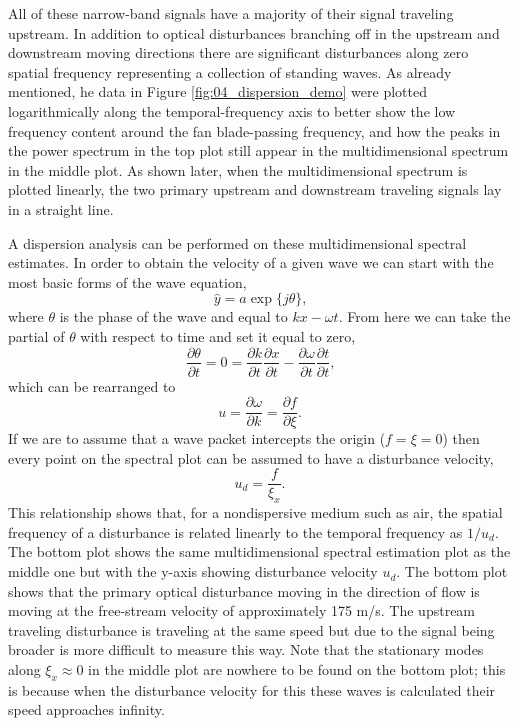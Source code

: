 All of these narrow-band signals have a majority of their signal traveling upstream.
In addition to optical disturbances branching off in the upstream and downstream moving directions there are significant disturbances along zero spatial frequency representing a collection of standing waves.
As already mentioned, he data in Figure \ref{fig:04_dispersion_demo} were plotted logarithmically along the temporal-frequency axis to better show the low frequency content around the fan blade-passing frequency, and how the peaks in the power spectrum in the top plot still appear in the multidimensional spectrum in the middle plot.
As shown later, when the multidimensional spectrum is plotted linearly, the two primary upstream and downstream traveling signals lay in a straight line.

A dispersion analysis can be performed on these multidimensional spectral estimates.
In order to obtain the velocity of a given wave we can start with the most basic forms of the wave equation,
\begin{equation}
  \hat{y} = a\exp\{j\theta\} \textrm{,}
\end{equation}
where $\theta$ is the phase of the wave and equal to $kx-\omega t$.
From here we can take the partial of $\theta$ with respect to time and set it equal to zero,
\begin{equation}
  \frac{\partial\theta}{\partial t} = 0 = \frac{\partial k}{\partial t}\frac{\partial x}{\partial t}-\frac{\partial \omega}{\partial t}\frac{\partial t}{\partial t} \textrm{,}
\end{equation}
which can be rearranged to
\begin{equation}
  u = \frac{\partial \omega}{\partial k} = \frac{\partial f}{\partial \xi} \textrm{.}
\end{equation}
If we are to assume that a wave packet intercepts the origin ($f=\xi=0$) then every point on the spectral plot can be assumed to have a disturbance velocity,
\begin{equation}
  u_{d} = \frac{f}{\xi_x} \textrm{.}
  \label{eqn:04_velocity_assumed}
\end{equation}
This relationship shows that, for a nondispersive medium such as air, the spatial frequency of a disturbance is related linearly to the temporal frequency as $1/u_d$.
The bottom plot shows the same multidimensional spectral estimation plot as the middle one but with the y-axis showing disturbance velocity $u_d$.
The bottom plot shows that the primary optical disturbance moving in the direction of flow is moving at the free-stream velocity of approximately 175 m/s.
The upstream traveling disturbance is traveling at the same speed but due to the signal being broader is more difficult to measure this way.
Note that the stationary modes along $\xi_x\approx0$ in the middle plot are nowhere to be found on the bottom plot; this is because when the disturbance velocity for this these waves is calculated their speed approaches infinity.

